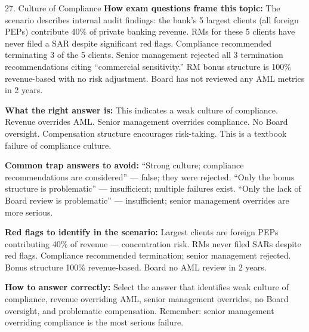 \documentclass[11pt,a4paper]{beamer}
\begin{document}
	\begin{frame}{27. Culture of Compliance}
		\tiny
		\noindent\textbf{How exam questions frame this topic:} The scenario describes internal audit findings: the bank's 5 largest clients (all foreign PEPs) contribute 40\% of private banking revenue. RMs for these 5 clients have never filed a SAR despite significant red flags. Compliance recommended terminating 3 of the 5 clients. Senior management rejected all 3 termination recommendations citing “commercial sensitivity.” RM bonus structure is 100\% revenue-based with no risk adjustment. Board has not reviewed any AML metrics in 2 years.
		
		\vspace{0.1cm}
		\noindent\textbf{What the right answer is:} This indicates a weak culture of compliance. Revenue overrides AML. Senior management overrides compliance. No Board oversight. Compensation structure encourages risk-taking. This is a textbook failure of compliance culture.
		
		\vspace{0.1cm}
		\noindent\textbf{Common trap answers to avoid:} “Strong culture; compliance recommendations are considered” — false; they were rejected. “Only the bonus structure is problematic” — insufficient; multiple failures exist. “Only the lack of Board review is problematic” — insufficient; senior management overrides are more serious.
		
		\vspace{0.1cm}
		\noindent\textbf{Red flags to identify in the scenario:} Largest clients are foreign PEPs contributing 40\% of revenue — concentration risk. RMs never filed SARs despite red flags. Compliance recommended termination; senior management rejected. Bonus structure 100\% revenue-based. Board no AML review in 2 years.
		
		\vspace{0.1cm}
		\noindent\textbf{How to answer correctly:} Select the answer that identifies weak culture of compliance, revenue overriding AML, senior management overrides, no Board oversight, and problematic compensation. Remember: senior management overriding compliance is the most serious failure.
	\end{frame}
	
\end{document}
